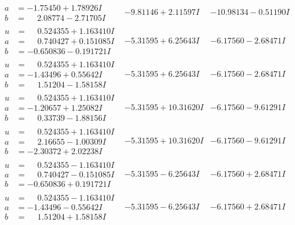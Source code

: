 \documentclass[1p]{elsarticle_modified}
\theoremstyle{definition}
\begin{document}
$$\begin{array}{c|c|c}
\begin{aligned}
a &= -1.75450 + 1.78926 I \\
b &= \phantom{-}2.08774 - 2.71705 I\end{aligned}
 & -9.81146 + 2.11597 I & -10.98134 - 0.51190 I \\ \hline\begin{aligned}
u &= \phantom{-}0.524355 + 1.163410 I \\
a &= \phantom{-}0.740427 + 0.151085 I \\
b &= -0.650836 - 0.191721 I\end{aligned}
 & -5.31595 + 6.25643 I & -6.17560 - 2.68471 I \\ \hline\begin{aligned}
u &= \phantom{-}0.524355 + 1.163410 I \\
a &= -1.43496 + 0.55642 I \\
b &= \phantom{-}1.51204 - 1.58158 I\end{aligned}
 & -5.31595 + 6.25643 I & -6.17560 - 2.68471 I \\ \hline\begin{aligned}
u &= \phantom{-}0.524355 + 1.163410 I \\
a &= -1.20657 + 1.25082 I \\
b &= \phantom{-}0.33739 - 1.88156 I\end{aligned}
 & -5.31595 + 10.31620 I & -6.17560 - 9.61291 I \\ \hline\begin{aligned}
u &= \phantom{-}0.524355 + 1.163410 I \\
a &= \phantom{-}2.16655 - 1.00309 I \\
b &= -2.30372 + 2.02238 I\end{aligned}
 & -5.31595 + 10.31620 I & -6.17560 - 9.61291 I \\ \hline\begin{aligned}
u &= \phantom{-}0.524355 - 1.163410 I \\
a &= \phantom{-}0.740427 - 0.151085 I \\
b &= -0.650836 + 0.191721 I\end{aligned}
 & -5.31595 - 6.25643 I & -6.17560 + 2.68471 I \\ \hline\begin{aligned}
u &= \phantom{-}0.524355 - 1.163410 I \\
a &= -1.43496 - 0.55642 I \\
b &= \phantom{-}1.51204 + 1.58158 I\end{aligned}
 & -5.31595 - 6.25643 I & -6.17560 + 2.68471 I \\ \hline\begin{aligned}

\end{aligned}
\end{array}$$
\end{document}
